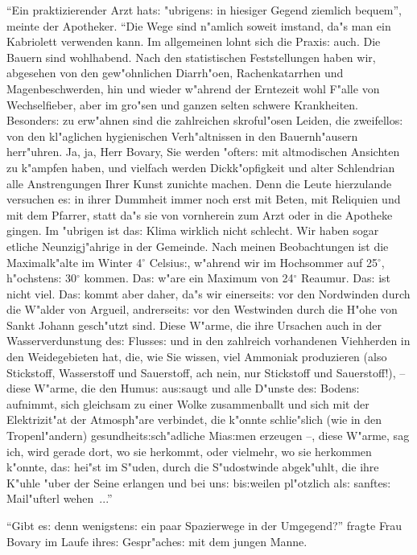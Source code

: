 \documentclass[oneside,12pt]{book}
\newcommand{\s}{s:}%
\begin{document}
"`Ein praktizierender Arzt hat{\s} "ubrigen{\s} in hiesiger Gegend
ziemlich bequem"', meinte der Apotheker. "`Die Wege sind n"amlich
soweit imstand, da"s man ein Kabriolett verwenden kann. Im
allgemeinen lohnt sich die Praxi{\s} auch. Die Bauern sind
wohlhabend. Nach den statistischen Feststellungen haben wir,
abgesehen von den gew"ohnlichen Diarrh"oen, Rachenkatarrhen und
Magenbeschwerden, hin und wieder w"ahrend der Erntezeit wohl
F"alle von Wechselfieber, aber im gro"sen und ganzen selten
schwere Krankheiten. Besonder{\s} zu erw"ahnen sind die
zahlreichen skroful"osen Leiden, die zweifello{\s} von den
kl"aglichen hygienischen Verh"altnissen in den Bauernh"ausern
herr"uhren. Ja, ja, Herr Bovary, Sie werden "ofter{\s} mit
altmodischen Ansichten zu k"ampfen haben, und vielfach werden
Dickk"opfigkeit und alter Schlendrian alle Anstrengungen Ihrer
Kunst zunichte machen. Denn die Leute hierzulande versuchen e{\s}
in ihrer Dummheit immer noch erst mit Beten, mit Reliquien und mit
dem Pfarrer, statt da"s sie von vornherein zum Arzt oder in die
Apotheke gingen. Im "ubrigen ist da{\s} Klima wirklich nicht
schlecht. Wir haben sogar etliche Neunzigj"ahrige in der Gemeinde.
Nach meinen Beobachtungen ist die Maximalk"alte im Winter
4${}^{\circ}$ Celsiu{\s}, w"ahrend wir im Hochsommer auf
25${}^{\circ}$, h"ochsten{\s} 30${}^{\circ}$ kommen. Da{\s}
w"are ein Maximum von 24${}^{\circ}$ Reaumur. Da{\s} ist
nicht viel. Da{\s} kommt aber daher, da"s wir einerseit{\s} vor den
Nordwinden durch die W"alder von Argueil, andrerseit{\s} vor den
Westwinden durch die H"ohe von Sankt Johann gesch"utzt sind. Diese
W"arme, die ihre Ursachen auch in der Wasserverdunstung de{\s}
Flusse{\s} und in den zahlreich vorhandenen Viehherden in den
Weidegebieten hat, die, wie Sie wissen, viel Ammoniak produzieren
(also Stickstoff, Wasserstoff und Sauerstoff, ach nein, nur
Stickstoff und Sauerstoff!), -- diese W"arme, die den Humu{\s}
au{\s}saugt und alle D"unste de{\s} Boden{\s} aufnimmt, sich
gleichsam zu einer Wolke zusammenballt und sich mit der
Elektrizit"at der Atmosph"are verbindet, die k"onnte schlie"slich
(wie in den Tropenl"andern) gesundheit{\s}sch"adliche Mia{\s}men
erzeugen --, diese W"arme, sag ich, wird gerade dort, wo sie
herkommt, oder vielmehr, wo sie herkommen k"onnte, da{\s} hei"st
im S"uden, durch die S"udostwinde abgek"uhlt, die ihre K"uhle
"uber der Seine erlangen und bei un{\s} bi{\s}weilen pl"otzlich
al{\s} sanfte{\s} Mail"ufterl wehen~..."'

"`Gibt e{\s} denn wenigsten{\s} ein paar Spazierwege in der
Umgegend?"' fragte Frau Bovary im Laufe ihre{\s} Gespr"ache{\s}
mit dem jungen Manne.
\end{document}

